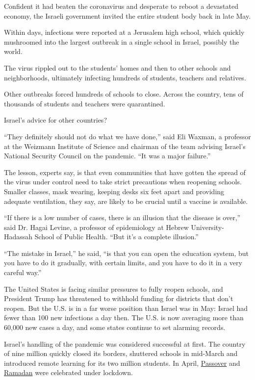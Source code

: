 Confident it had beaten the coronavirus and desperate to reboot a
devastated economy, the Israeli government invited the entire student
body back in late May.

Within days, infections were reported at a Jerusalem high school, which
quickly mushroomed into the largest outbreak in a single school in
Israel, possibly the world.

The virus rippled out to the students' homes and then to other schools
and neighborhoods, ultimately infecting hundreds of students, teachers
and relatives.

Other outbreaks forced hundreds of schools to close. Across the country,
tens of thousands of students and teachers were quarantined.

Israel's advice for other countries?

``They definitely should not do what we have done,'' said Eli Waxman, a
professor at the Weizmann Institute of Science and chairman of the team
advising Israel's National Security Council on the pandemic. ``It was a
major failure.''

The lesson, experts say, is that even communities that have gotten the
spread of the virus under control need to take strict precautions when
reopening schools. Smaller classes, mask wearing, keeping desks six feet
apart and providing adequate ventilation, they say, are likely to be
crucial until a vaccine is available.

``If there is a low number of cases, there is an illusion that the
disease is over,'' said Dr. Hagai Levine, a professor of epidemiology at
Hebrew University-Hadassah School of Public Health. ``But it's a
complete illusion.''

``The mistake in Israel,'' he said, ``is that you can open the education
system, but you have to do it gradually, with certain limits, and you
have to do it in a very careful way.''

The United States is facing similar pressures to fully reopen schools,
and President Trump has threatened to withhold funding for districts
that don't reopen. But the U.S. is in a far worse position than Israel
was in May: Israel had fewer than 100 new infections a day then. The
U.S. is now averaging more than 60,000 new cases a day, and some states
continue to set alarming records.

Israel's handling of the pandemic was considered successful at first.
The country of nine million quickly closed its borders, shuttered
schools in mid-March and introduced remote learning for its two million
students. In April,
\href{https://www.nytimes.com/2020/04/07/world/middleeast/coronavirus-passover-israel.html?searchResultPosition=1}{Passover}
and
\href{https://www.nytimes.com/2020/05/15/world/middleeast/ramadan-coronavirus-al-aqsa.html?searchResultPosition=1}{Ramadan}
were celebrated under lockdown.

